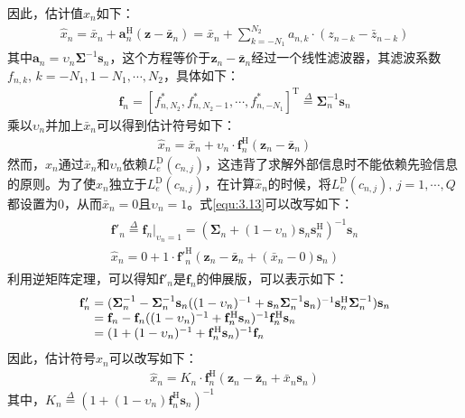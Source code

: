 因此，估计值$\hat{x}_n$如下：
\begin{eqnarray}
    \hat{x}_n=\bar{x}_n+\mathbf{a}_n^{\mathrm{H}}(\mathbf{z}-\bar{\mathbf{z}}_n)=\bar{x}_n+\sum_{k=-N_1}^{N_2}a_{n,k}\cdot(z_{n-k}-\bar{z}_{n-k})
    \label{equ:3.11}
\end{eqnarray}
其中$\mathbf{a}_n=\upsilon_n\boldsymbol{\Sigma}^{-1}\mathbf{s}_n$，这个方程等价于$\mathbf{z}_n-\bar{\mathbf{z}}_n$经过一个线性滤波器，其滤波系数$f_{n,k},\,k=-N_1,1-N_1,\cdots,N_2$，具体如下：
\begin{eqnarray}
    \mathbf{f}_n=[f_{n,N_2}^*,f_{n,N_2-1}^*,\cdots,f_{n,-N_1}^*]^{\mathrm{T}}\overset{\Delta}{=}\boldsymbol{\Sigma}_n^{-1}\mathbf{s}_n
    \label{equ:3.12}
\end{eqnarray}
乘以$\upsilon_n$并加上$\bar{x}_n$可以得到估计符号如下：
\begin{eqnarray}
    \hat{x}_n=\bar{x}_n+\upsilon_n\cdot\mathbf{f}_n^{\mathrm{H}}(\mathbf{z}_n-\bar{\mathbf{z}}_n)
    \label{equ:3.13}
\end{eqnarray}
然而，$\hat{x}_n$通过$\bar{x}_n$和$\upsilon_n$依赖$L_e^{\mathrm{D}}(c_{n,j})$，这违背了求解外部信息时不能依赖先验信息的原则。为了使$\hat{x}_n$独立于$L_e^{\mathrm{D}}(c_{n,j})$，在计算$\hat{x}_n$的时候，将$L_e^{\mathrm{D}}(c_{n,j}),\,j=1,\cdots,Q$都设置为$0$，从而$\bar{x}_n=0$且$\upsilon_n=1$。式\ref{equ:3.13}可以改写如下：
\begin{eqnarray}
    \begin{array}{c}
    {\mathbf{f}}'_n\overset{\Delta}{=}\mathbf{f}_n|_{\upsilon_n=1}=(\boldsymbol{\Sigma}_n+(1-\upsilon_n)\mathbf{s}_n\mathbf{s}_n^{\mathrm{H}})^{-1}\mathbf{s}_n\\
    \hat{x}_n=0+1\cdot{{\mathbf{f}}'}_n^{\mathrm{H}}(\mathbf{z}_n-\bar{\mathbf{z}}_n+(\bar{x}_n-0)\mathbf{s}_n)
\end{array}
    \label{equ:3.14}
\end{eqnarray}
利用逆矩阵定理，可以得知${\mathbf{f}}'_n$是$\mathbf{f}_n$的伸展版，可以表示如下：
\begin{eqnarray}
    \begin{array}{l@{\;=\;}l}
        {\mathbf{f}}'_n&(\boldsymbol{\Sigma}_n^{-1}-\boldsymbol{\Sigma}_n^{-1}\mathbf{s}_n((1-\upsilon_n)^{-1}+\mathbf{s}_n\boldsymbol{\Sigma}_n^{-1}\mathbf{s}_n)^{-1}\mathbf{s}_n^{\mathrm{H}}\boldsymbol{\Sigma}_n^{-1})\mathbf{s}_n\\
        &\mathbf{f}_n-\mathbf{f}_n((1-\upsilon_n)^{-1}+\mathbf{f}_n^{\mathrm{H}}\mathbf{s}_n)^{-1}\mathbf{f}_n^{\mathrm{H}}\mathbf{s}_n\\
        &(1+(1-\upsilon_n)^{-1}+\mathbf{f}_n^{\mathrm{H}}\mathbf{s}_n)^{-1}\mathbf{f}_n
    \end{array}
    \label{equ:3.15}
\end{eqnarray}
因此，估计符号$\hat{x}_n$可以改写如下：
\begin{eqnarray}
    \hat{x}_n=K_n\cdot\mathbf{f}_n^{\mathrm{H}}(\mathbf{z}_n-\bar{\mathbf{z}}_n+\bar{x}_n\mathbf{s}_n)
    \label{equ:3.16}
\end{eqnarray}
其中，$K_n\overset{\Delta}{=}(1+(1-\upsilon_n)\mathbf{f}_n^{\mathrm{H}}\mathbf{s}_n)^{-1}$
